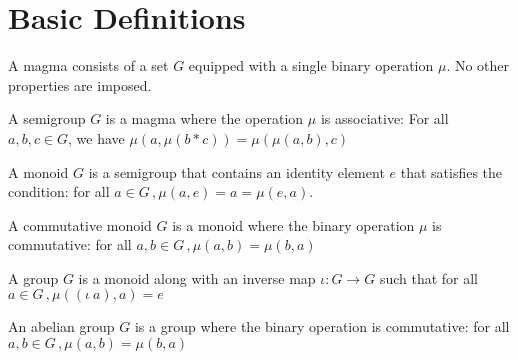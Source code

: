 %

\chapter{Basic Definitions}

\begin{definition}[Magma]
    \label{definition : magma}
    \leanok 
    A magma consists of a set $G$ equipped with a single binary operation $\mu$. 
    No other properties are imposed.
\end{definition}

\begin{definition}[Semigroup]
  \label{definition : semigroup}
  \leanok 
  A semigroup $G$ is a magma where the operation $\mu$ is associative: 
  For all $a, b, c \in G$, we have $\mu(a , \mu (b * c)) = \mu(\mu(a, b), c)$
\end{definition}

\begin{definition}[Monoid]
  \label{definition : monoid}
  \leanok 
  A monoid $G$ is a semigroup that contains an identity element $e$ that satisfies the condition:
  for all $a \in G\, , \mu(a, e) = a = \mu(e, a)$.
\end{definition}

\begin{definition}
  \label{definition: commutative monoid}
  \leanok 
  A commutative monoid $G$ is a monoid where the binary operation $\mu$ is commutative: 
  for all $a, b \in G\, , \mu (a, b) = \mu(b, a)$
\end{definition}

\begin{definition}[Group]
  \label{definition: group}
  \leanok 
  A group $G$ is a monoid along with an inverse map $\iota : G \to G$ such that  
  for all $a \in G\, , \mu ((\iota~a), a) = e$
\end{definition}

\begin{definition}
  \label{definition: abelian group}
  \leanok 
  An abelian group $G$ is a group where the binary operation is commutative:
  for all $a, b \in G\, , \mu (a, b) = \mu(b, a)$
\end{definition}
